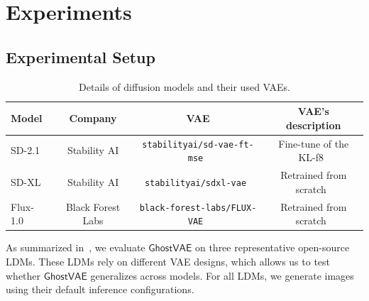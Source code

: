 \documentclass[letterpaper,twocolumn,10pt]{article}
\newcommand{\mg}{$\mathsf{GhostVAE}$\xspace}
\newcommand{\mypara}[1]{\smallskip\noindent{\bf {#1}.} \xspace}
\begin{document}
\section{Experiments}
\label{section:exp}

\subsection{Experimental Setup}

\begin{table}[t]
\centering
\caption{Details of diffusion models and their used VAEs.}
\label{tab:diffusion_models}
\setlength{\tabcolsep}{10pt}
\begin{tabular}{lccc}
\toprule
Model & Company & VAE   & VAE's description \\
\midrule
SD-2.1~\cite{Rombach2021HighResolutionIS}
& Stability AI
& \texttt{stabilityai/sd-vae-ft-mse}~\cite{sdvaemseft}
& Fine-tune of the KL-f8~\cite{Rombach2021HighResolutionIS} \\
SD-XL~\cite{podell2024sdxl} 
& Stability AI
& \texttt{stabilityai/sdxl-vae}~\cite{sdxlvae}
& Retrained from scratch~\cite{podell2024sdxl} \\
Flux-1.0~\cite{labs2025flux1kontextflowmatching}
& Black Forest Labs
& \texttt{black-forest-labs/FLUX-VAE}~\cite{flux2024}
& Retrained from scratch~\cite{labs2025flux1kontextflowmatching} \\
\bottomrule
\end{tabular}
\end{table}

\mypara{Diffusion Models}
As summarized in~, we evaluate \mg on three representative open-source LDMs.
These LDMs rely on different VAE designs, which allows us to test whether \mg generalizes across models.
For all LDMs, we generate images using their default inference configurations.
\end{document}
